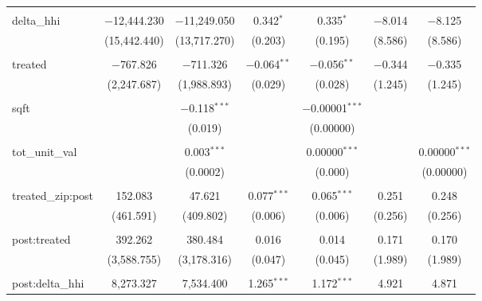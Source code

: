 \begin{table}[H]
{\begin{tabular}{@{\extracolsep{5pt}}lcccccc}
   & & & & & & \\  

  delta\_hhi & $-$12,444.230 & $-$11,249.050 & 0.342$^{*}$ & 0.335$^{*}$ & $-$8.014 & $-$8.125 \\  

   & (15,442.440) & (13,717.270) & (0.203) & (0.195) & (8.586) & (8.586) \\  

   & & & & & & \\  

  treated & $-$767.826 & $-$711.326 & $-$0.064$^{**}$ & $-$0.056$^{**}$ & $-$0.344 & $-$0.335 \\  

   & (2,247.687) & (1,988.893) & (0.029) & (0.028) & (1.245) & (1.245) \\  

   & & & & & & \\  

  sqft &  & $-$0.118$^{***}$ &  & $-$0.00001$^{***}$ &  &  \\  

   &  & (0.019) &  & (0.00000) &  &  \\  

   & & & & & & \\  

  tot\_unit\_val &  & 0.003$^{***}$ &  & 0.00000$^{***}$ &  & 0.00000$^{***}$ \\  

   &  & (0.0002) &  & (0.000) &  & (0.00000) \\  

   & & & & & & \\  

  treated\_zip:post & 152.083 & 47.621 & 0.077$^{***}$ & 0.065$^{***}$ & 0.251 & 0.248 \\  

   & (461.591) & (409.802) & (0.006) & (0.006) & (0.256) & (0.256) \\  

   & & & & & & \\  

  post:treated & 392.262 & 380.484 & 0.016 & 0.014 & 0.171 & 0.170 \\  

   & (3,588.755) & (3,178.316) & (0.047) & (0.045) & (1.989) & (1.989) \\  

   & & & & & & \\  

  post:delta\_hhi & 8,273.327 & 7,534.400 & 1.265$^{***}$ & 1.172$^{***}$ & 4.921 & 4.871 \\  


\end{tabular}}
\end{table}
